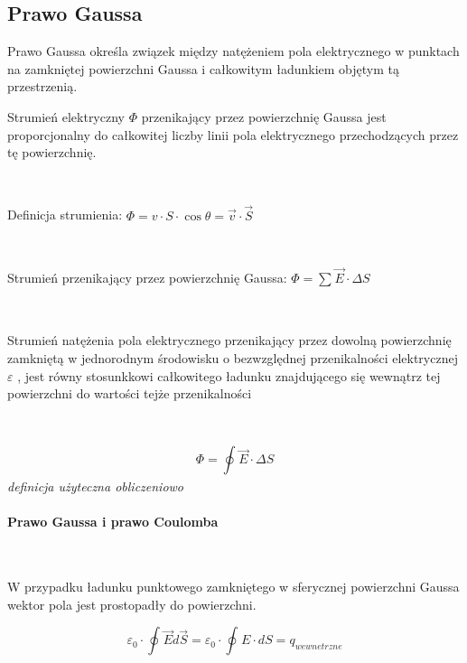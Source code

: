 \documentclass{article}
\begin{document}
        \subsection{Prawo Gaussa}
            Prawo Gaussa określa związek między natężeniem pola
            elektrycznego w punktach na zamkniętej powierzchni 
            Gaussa i całkowitym ładunkiem objętym tą przestrzenią.
            \
            
            Strumień elektryczny $\Phi$ przenikający przez powierzchnię
            Gaussa jest proporcjonalny do całkowitej liczby linii pola
            elektrycznego przechodzących przez tę powierzchnię.

            \

            Definicja strumienia:
            $\Phi = v\cdotp S \cdotp \cos\theta = \vec{v} \cdotp 
            \vec{S}$

            \
            
            Strumień przenikający przez powierzchnię Gaussa:
            $\Phi = \sum\nolimits_{}\vec{E} \cdotp \Delta S$

            \

            Strumień natężenia pola elektrycznego przenikający przez
            dowolną powierzchnię zamkniętą w jednorodnym środowisku
            o bezwzględnej przenikalności elektrycznej $\varepsilon$
            , jest równy stosunkkowi całkowitego ładunku znajdującego
            się wewnątrz tej powierzchni do wartości tejże przenikalności
            
            \
            
            \begin{equation}
                \Phi = \oint\nolimits_{} \vec{E}\cdotp\Delta S
            \end{equation}
            \textit{definicja użyteczna obliczeniowo}
            
            \paragraph{Prawo Gaussa i prawo Coulomba} 
            \

            W przypadku ładunku
            punktowego zamkniętego w sferycznej powierzchni
            Gaussa wektor pola jest prostopadły do powierzchni.

            \begin{equation}
                \varepsilon_0 \cdotp \oint\nolimits_{} \vec{E} d\vec{S}
                = \varepsilon_0 \cdotp \oint\nolimits_{} E \cdotp dS
                = q_{wewnetrzne}    
            \end{equation}
\end{document}
